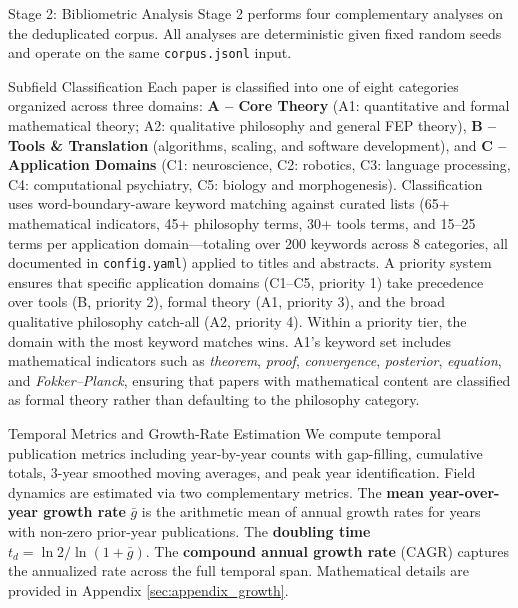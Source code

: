 \documentclass[
  ignorenonframetext,
]{beamer}
\author{\texorpdfstring{}{}}
\date{}
\begin{document}
\begin{frame}[fragile]{Stage 2: Bibliometric Analysis
\label{sec:methods_bibliometrics}}
\protect{}\label{stage-2-bibliometric-analysis}
Stage 2 performs four complementary analyses on the deduplicated corpus.
All analyses are deterministic given fixed random seeds and operate on
the same \texttt{corpus.jsonl} input.

\begin{block}{Subfield Classification}
\protect{}\label{subfield-classification}
Each paper is classified into one of eight categories organized across
three domains: \textbf{A -- Core Theory} (A1: quantitative and formal
mathematical theory; A2: qualitative philosophy and general FEP theory),
\textbf{B -- Tools \& Translation} (algorithms, scaling, and software
development), and \textbf{C -- Application Domains} (C1: neuroscience,
C2: robotics, C3: language processing, C4: computational psychiatry, C5:
biology and morphogenesis). Classification uses word-boundary-aware
keyword matching against curated lists (65+ mathematical indicators, 45+
philosophy terms, 30+ tools terms, and 15--25 terms per application
domain---totaling over 200 keywords across 8 categories, all documented
in \texttt{config.yaml}) applied to titles and abstracts. A priority
system ensures that specific application domains (C1--C5, priority 1)
take precedence over tools (B, priority 2), formal theory (A1, priority
3), and the broad qualitative philosophy catch-all (A2, priority 4).
Within a priority tier, the domain with the most keyword matches wins.
A1's keyword set includes mathematical indicators such as
\emph{theorem}, \emph{proof}, \emph{convergence}, \emph{posterior},
\emph{equation}, and \emph{Fokker--Planck}, ensuring that papers with
mathematical content are classified as formal theory rather than
defaulting to the philosophy category.
\end{block}

\begin{block}{Temporal Metrics and Growth-Rate Estimation}
\protect{}\label{temporal-metrics-and-growth-rate-estimation}
We compute temporal publication metrics including year-by-year counts
with gap-filling, cumulative totals, 3-year smoothed moving averages,
and peak year identification. Field dynamics are estimated via two
complementary metrics. The \textbf{mean year-over-year growth rate}
\(\bar{g}\) is the arithmetic mean of annual growth rates for years with
non-zero prior-year publications. The \textbf{doubling time}
\(t_d = \ln 2 / \ln(1 + \bar{g})\). The \textbf{compound annual growth
rate} (CAGR) captures the annualized rate across the full temporal span.
Mathematical details are provided in Appendix \ref{sec:appendix_growth}.
\end{block}


\end{frame}
\end{document}
